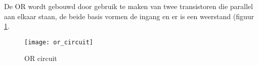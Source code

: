 De OR wordt gebouwd door gebruik te maken van twee transistoren die parallel aan elkaar staan, de beide basis vormen de ingang en er is een weerstand (figuur \ref{circuit:or}.

\begin{figure}[h]
\texttt{[image: or\_circuit]}
\centering
\caption{OR circuit}
\label{circuit:or}
\end{figure}

